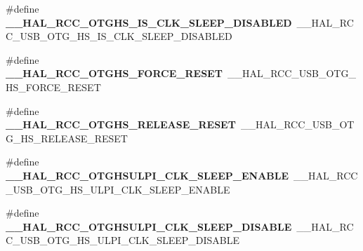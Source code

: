 \begin{DoxyCompactItemize}
\item 
\hypertarget{group___h_a_l___r_c_c___aliased_gaf3cd4d85b55fc5bfd19d839d315eaa80}{\#define {\bfseries \-\_\-\-\_\-\-H\-A\-L\-\_\-\-R\-C\-C\-\_\-\-O\-T\-G\-H\-S\-\_\-\-I\-S\-\_\-\-C\-L\-K\-\_\-\-S\-L\-E\-E\-P\-\_\-\-D\-I\-S\-A\-B\-L\-E\-D}~\-\_\-\-\_\-\-H\-A\-L\-\_\-\-R\-C\-C\-\_\-\-U\-S\-B\-\_\-\-O\-T\-G\-\_\-\-H\-S\-\_\-\-I\-S\-\_\-\-C\-L\-K\-\_\-\-S\-L\-E\-E\-P\-\_\-\-D\-I\-S\-A\-B\-L\-E\-D}\label{group___h_a_l___r_c_c___aliased_gaf3cd4d85b55fc5bfd19d839d315eaa80}

\item 
\hypertarget{group___h_a_l___r_c_c___aliased_gaba098ab8f27b638745864ad795ac250a}{\#define {\bfseries \-\_\-\-\_\-\-H\-A\-L\-\_\-\-R\-C\-C\-\_\-\-O\-T\-G\-H\-S\-\_\-\-F\-O\-R\-C\-E\-\_\-\-R\-E\-S\-E\-T}~\-\_\-\-\_\-\-H\-A\-L\-\_\-\-R\-C\-C\-\_\-\-U\-S\-B\-\_\-\-O\-T\-G\-\_\-\-H\-S\-\_\-\-F\-O\-R\-C\-E\-\_\-\-R\-E\-S\-E\-T}\label{group___h_a_l___r_c_c___aliased_gaba098ab8f27b638745864ad795ac250a}

\item 
\hypertarget{group___h_a_l___r_c_c___aliased_ga286e97629c121fbc1de30fe10102f34d}{\#define {\bfseries \-\_\-\-\_\-\-H\-A\-L\-\_\-\-R\-C\-C\-\_\-\-O\-T\-G\-H\-S\-\_\-\-R\-E\-L\-E\-A\-S\-E\-\_\-\-R\-E\-S\-E\-T}~\-\_\-\-\_\-\-H\-A\-L\-\_\-\-R\-C\-C\-\_\-\-U\-S\-B\-\_\-\-O\-T\-G\-\_\-\-H\-S\-\_\-\-R\-E\-L\-E\-A\-S\-E\-\_\-\-R\-E\-S\-E\-T}\label{group___h_a_l___r_c_c___aliased_ga286e97629c121fbc1de30fe10102f34d}

\item 
\hypertarget{group___h_a_l___r_c_c___aliased_ga53cf7b3f9670f3595220a196e54f2efa}{\#define {\bfseries \-\_\-\-\_\-\-H\-A\-L\-\_\-\-R\-C\-C\-\_\-\-O\-T\-G\-H\-S\-U\-L\-P\-I\-\_\-\-C\-L\-K\-\_\-\-S\-L\-E\-E\-P\-\_\-\-E\-N\-A\-B\-L\-E}~\-\_\-\-\_\-\-H\-A\-L\-\_\-\-R\-C\-C\-\_\-\-U\-S\-B\-\_\-\-O\-T\-G\-\_\-\-H\-S\-\_\-\-U\-L\-P\-I\-\_\-\-C\-L\-K\-\_\-\-S\-L\-E\-E\-P\-\_\-\-E\-N\-A\-B\-L\-E}\label{group___h_a_l___r_c_c___aliased_ga53cf7b3f9670f3595220a196e54f2efa}

\item 
\hypertarget{group___h_a_l___r_c_c___aliased_gac2ca3744cd2801d4d67b745cc7efc725}{\#define {\bfseries \-\_\-\-\_\-\-H\-A\-L\-\_\-\-R\-C\-C\-\_\-\-O\-T\-G\-H\-S\-U\-L\-P\-I\-\_\-\-C\-L\-K\-\_\-\-S\-L\-E\-E\-P\-\_\-\-D\-I\-S\-A\-B\-L\-E}~\-\_\-\-\_\-\-H\-A\-L\-\_\-\-R\-C\-C\-\_\-\-U\-S\-B\-\_\-\-O\-T\-G\-\_\-\-H\-S\-\_\-\-U\-L\-P\-I\-\_\-\-C\-L\-K\-\_\-\-S\-L\-E\-E\-P\-\_\-\-D\-I\-S\-A\-B\-L\-E}\label{group___h_a_l___r_c_c___aliased_gac2ca3744cd2801d4d67b745cc7efc725}


\end{DoxyCompactItemize}
